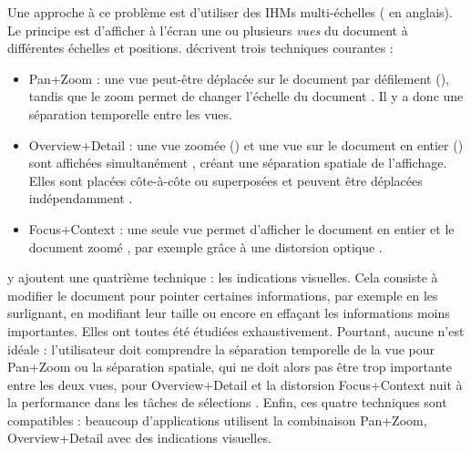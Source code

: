 
Une approche à ce problème est d'utiliser des IHMs multi-échelles ( en anglais). Le principe est d'afficher à l'écran une ou plusieurs \emph{vues} du document à différentes échelles et positions. \cite{Guiard2004} décrivent trois techniques courantes :
\begin{itemize}
  \item Pan+Zoom : une vue peut-être déplacée sur le document par défilement (), tandis que le zoom permet de changer l'échelle du document . Il y a donc une séparation temporelle entre les vues.
  \item Overview+Detail : une vue zoomée () et une vue sur le document en entier () sont affichées simultanément , créant une séparation spatiale de l'affichage. Elles sont placées côte-à-côte ou superposées et peuvent être déplacées indépendamment .
  \item Focus+Context : une seule vue permet d'afficher le document en entier et le document zoomé , par exemple grâce à une distorsion optique .
\end{itemize}
\medskip

\cite{Cockburn2008} y ajoutent une quatrième technique : les indications visuelles. Cela consiste à modifier le document pour pointer certaines informations, par exemple en les surlignant, en modifiant leur taille ou encore en effaçant les informations moins importantes. Elles ont toutes été étudiées exhaustivement. Pourtant, aucune n'est idéale : l'utilisateur doit comprendre la séparation temporelle de la vue pour Pan+Zoom ou la séparation spatiale, qui ne doit alors pas être trop importante entre les deux vues, pour Overview+Detail et la distorsion Focus+Context nuit à la performance dans les tâches de sélections \citep{Cockburn2008}. Enfin, ces quatre techniques sont compatibles : beaucoup d'applications utilisent la combinaison Pan+Zoom, Overview+Detail avec des indications visuelles.

